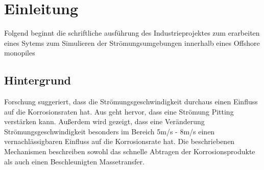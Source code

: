 
\chapter{Einleitung}
Folgend beginnt die schriftliche ausführung des Industrieprojektes zum erarbeiten eines Sytems zum Simulieren der Strömungsumgebungen innerhalb eines Offshore monopiles 

\section{Hintergrund}
Forschung suggeriert, dass die Strömungsgeschwindigkeit durchaus einen Einfluss auf die Korrosionsraten hat. Aus \cite{xu_flow_2021} geht hervor, dass eine Strömung Pitting verstärken kann. Außerdem wird gezeigt, dass eine Veränderung Strömungsgeschwindigkeit besonders im Bereich 5m/s - 8m/s einen vernachlässigbaren Einfluss auf die Korrosionsrate hat. Die beschriebenen Mechanismen beschreiben sowohl das schnelle Abtragen der Korrosionsprodukte als auch einen Beschleunigten Massetransfer.